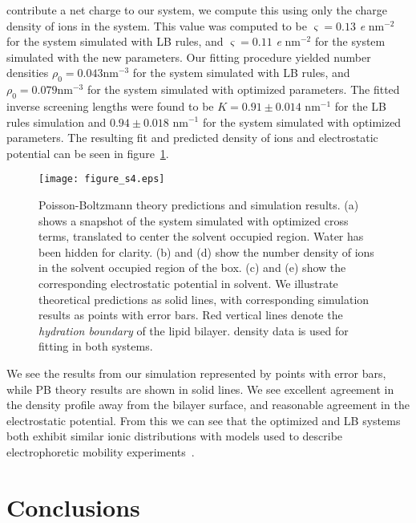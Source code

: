 contribute a net charge to our system, we compute this using only the
charge density of ions in the system. 
This value was computed to be $\varsigma=0.13$ \emph{e} nm$^{-2}$ for the system simulated with LB rules, and 
$\varsigma=0.11$ \emph{e} nm$^{-2}$ for the system simulated with the new parameters.
Our fitting procedure yielded 
number densities $\rho _{0}=0.043\text{nm}^{-3}$ for the system simulated with LB rules, 
and $\rho _{0}=0.079\text{nm}^{-3}$ for the system simulated with optimized parameters.
The fitted inverse screening lengths were found to be $K=0.91 \pm 0.014$ nm$^{-1}$ for the LB rules simulation 
and $0.94 \pm 0.018$ nm$^{-1}$ for the system simulated with optimized parameters.
The resulting fit and predicted
density of \na ions and electrostatic potential can be seen in
figure~\ref{figch2:gouy}. 
\begin{figure}
    \caption[Poisson-Boltzmann theory predictions and simulation results.]{
        Poisson-Boltzmann theory predictions and simulation results. (a) shows a snapshot of the 
system simulated with optimized cross terms, translated
to center the solvent occupied region. Water has been hidden
for clarity. (b) and (d)
    show the number density of ions in the solvent occupied region of the box. 
    (c) and (e) show the corresponding electrostatic potential in solvent.
    We illustrate theoretical predictions as solid lines, with corresponding 
    simulation results as points with error bars. Red vertical lines denote the \emph{hydration boundary} of the lipid bilayer. 
    \cl density data is used for fitting in both systems. 
}
    \label{figch2:gouy}
    \texttt{[image: figure\_s4.eps]}
\end{figure}
We see the results from our simulation
represented by points with error bars, while PB theory results are
shown in solid lines.  We see excellent agreement in the \na density
profile away from the bilayer surface, and reasonable agreement in the
electrostatic potential. From this we can see that the optimized and LB
systems both exhibit similar ionic distributions with models used to
describe electrophoretic mobility
experiments~\cite{israelachvili:2011:intermol}.

\section{Conclusions}

